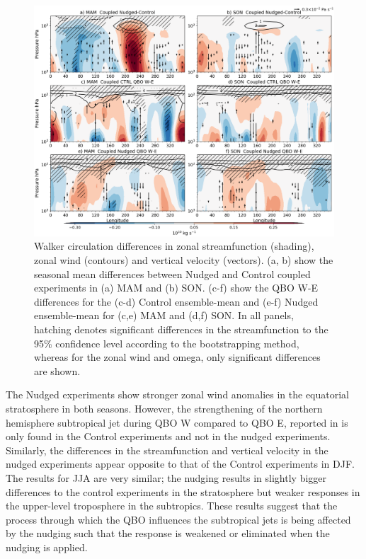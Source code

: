 \begin{figure}[t!]
\centering
 \includegraphics[width=\linewidth]{figures/suite_coupledwalker.png}
\caption[Walker circulation in coupled nudged experiments.]{Walker circulation differences in zonal streamfunction (shading), zonal wind (contours) and vertical velocity (vectors). (a, b) show the seasonal mean differences between Nudged and Control coupled experiments in (a) MAM and (b) SON. (c-f) show the QBO W-E differences for the (c-d) Control ensemble-mean and (e-f) Nudged  ensemble-mean for (c,e) MAM and (d,f) SON. In all panels, hatching denotes significant differences in the streamfunction to the 95\% confidence level according to the bootstrapping method, whereas for the zonal wind and omega, only significant differences are shown.}
\label{fig:walker_coupled}
\end{figure}


The Nudged experiments show stronger zonal wind anomalies in the equatorial stratosphere in both seasons. However, the strengthening of the northern hemisphere subtropical jet during QBO W compared to QBO E, reported in \citep{garfinkel2010} is only found in the Control experiments and not in the nudged experiments. 
Similarly, the differences in the streamfunction and vertical velocity in the nudged experiments appear opposite to that of the Control experiments in DJF. 
The results for JJA are very similar; the nudging results in slightly bigger differences to the control experiments in the stratosphere but weaker responses in the upper-level troposphere in the subtropics.
These results suggest that the process through which the QBO influences the subtropical jets is being affected by the nudging such that the response is weakened or eliminated when the nudging is applied.

